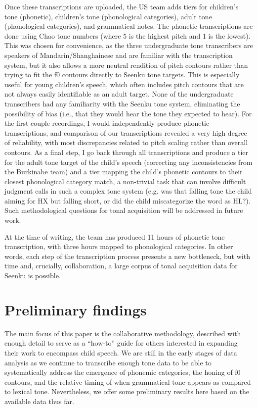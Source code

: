 \documentclass[output=paper,colorlinks,citecolor=brown,
]{langscibook}
\begin{document}
Once these transcriptions are uploaded, the US team adds tiers for children's tone (phonetic), children's tone (phonological categories), adult tone (phonological categories), and grammatical notes. The phonetic transcriptions are done using Chao tone numbers (where 5 is the highest pitch and 1 is the lowest). This was chosen for convenience, as the three undergraduate tone transcribers are speakers of Mandarin/Shanghainese and are familiar with the transcription system, but it also allows a more neutral rendition of pitch contours rather than trying to fit the f0 contours directly to Seenku tone targets. This is especially useful for young children's speech, which often includes pitch contours that are not always easily identifiable as an adult target. None of the undergraduate transcribers had any familiarity with the Seenku tone system, eliminating the possibility of bias (i.e., that they would hear the tone they expected to hear). For the first couple recordings, I would independently produce phonetic transcriptions, and comparison of our transcriptions revealed a very high degree of reliability, with most discrepancies related to pitch scaling rather than overall contours. As a final step, I go back through all transcriptions and produce a tier for the adult tone target of the child's speech (correcting any inconsistencies from the Burkinabe team) and a tier mapping the child's phonetic contours to their closest phonological category match, a non-trivial task that can involve difficult judgment calls in such a complex tone system (e.g. was that falling tone the child aiming for HX but falling short, or did the child miscategorize the word as HL?). Such methodological questions for tonal acquisition will be addressed in future work. 

At the time of writing, the team has produced 11 hours of phonetic tone transcription, with three hours mapped to phonological categories. In other words, each step of the transcription process presents a new bottleneck, but with time and, crucially, collaboration, a large corpus of tonal acquisition data for Seenku is possible.  


\section{Preliminary findings}\label{sec:mcpherson:findings}

The main focus of this paper is the collaborative methodology, described with enough detail to serve as a ``how-to'' guide for others interested in expanding their work to encompass child speech. We are still in the early stages of data analysis as we continue to transcribe enough tone data to be able to systematically address the emergence of phonemic categories, the honing of f0 contours, and the relative timing of when grammatical tone appears as compared to lexical tone. Nevertheless, we offer some preliminary results here based on the available data thus far. 
\end{document}
